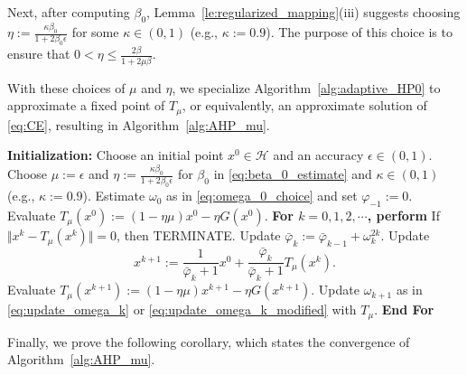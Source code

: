 \documentclass{article}
\theoremstyle{plain}
\theoremstyle{definition}
\newcommand{\norms}[1]{\Vert#1\Vert}
\newcommand{\0}{\boldsymbol{0}}
\begin{document}
Next, after computing $\beta_0$, Lemma~\ref{le:regularized_mapping}(iii) suggests choosing $\eta := \frac{\kappa \beta_0}{1 + 2\beta_0\epsilon}$ for some $\kappa \in (0, 1)$ (e.g., $\kappa := 0.9$).
The purpose of this choice is to ensure that $0 < \eta \leq \frac{2\beta}{1 + 2\mu\beta}$.

With these choices of $\mu$ and $\eta$, we specialize Algorithm~\ref{alg:adaptive_HP0} to approximate a fixed point of $T_{\mu}$, or equivalently, an approximate solution of \eqref{eq:CE}, resulting in Algorithm~\ref{alg:AHP_mu}.

\begin{algorithm}[!htbp]
\caption{(Parameter-Free HP Algorithm for Co-coercive Equation \eqref{eq:CE})}\label{alg:AHP_mu}
\begin{algorithmic}[1]
\State\textbf{Initialization:} Choose an initial point $x^0\in\mathcal H$ and an accuracy $\epsilon \in (0, 1)$.
\State Choose $\mu := \epsilon$ and $\eta := \frac{\kappa\beta_0}{1 + 2\beta_0\epsilon}$ for $\beta_0$ in \eqref{eq:beta_0_estimate} and $\kappa \in (0, 1)$ (e.g., $\kappa := 0.9$).
\State Estimate $\omega_0$ as in \eqref{eq:omega_0_choice} and set $\varphi_{-1} := 0$.
\State Evaluate $T_{\mu}(x^0) := (1 - \eta\mu)x^0 - \eta G(x^0)$.
\State \textbf{For $k = 0, 1, 2, \cdots$, perform}
\State\hspace{3ex}If ~$\norms{x^k - T_{\mu}(x^k)} = 0$,  then TERMINATE.
\State\hspace{3ex}Update $\bar{\varphi}_{k} := \bar{\varphi}_{k-1} + \omega_k^{2k}$.
\State\hspace{3ex}\label{alg3:step5}Update
\begin{equation*}
x^{k+1} :=  \frac{1}{ \bar{\varphi}_k + 1} x^0 + \frac{ \bar{\varphi}_k}{\bar{\varphi}_k + 1}T_{\mu}(x^k).
\end{equation*}
\State\hspace{3ex}\label{alg3:step6}Evaluate $T_{\mu}(x^{k+1}) := (1-\eta\mu)x^{k+1} - \eta G(x^{k+1})$.
\State\hspace{3ex}\label{alg3:step7}Update $\omega_{k+1}$ as in \eqref{eq:update_omega_k} or \eqref{eq:update_omega_k_modified} with $T_{\mu}$.
\State\textbf{End For}
\end{algorithmic}
\end{algorithm}

Finally, we prove the following corollary, which states the convergence of Algorithm~\ref{alg:AHP_mu}.
\end{document}

